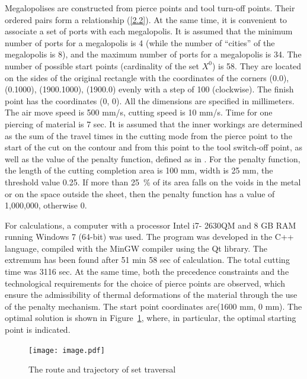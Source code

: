 Megalopolises are constructed from pierce points and tool turn-off points.
Their ordered pairs form a relationship (\ref{2.2}).
At the same time,
it is convenient to associate a set of ports with each megalopolis.
It is assumed that the minimum number of ports for a megalopolis is 4
(while the number of ``cities'' of the megalopolis is 8),
and the maximum number of ports for a megalopolis is 34.
The number of possible start points
(cardinality of the set $ X ^ 0 $)
is 58.
They are located on the sides of the original rectangle
with the coordinates of the corners
(0.0), (0.1000), (1900.1000), (1900.0)
evenly with a step of 100
(clockwise).
The finish point has the coordinates (0, 0).
All the dimensions are specified in millimeters.
The air move speed is 500 mm/s,
cutting speed is 10 mm/s.
Time for one piercing of material is 7 sec.
It is assumed that the inner workings are determined
as the sum of the travel times in the cutting mode
from the pierce point to the start of the cut on the contour
and from this point to
the tool switch-off point,
as well as the value of the penalty function,
defined as in
\cite{18}.
For the penalty function,
the length of the cutting completion area is 100 mm,
width is 25 mm,
the threshold value 0.25.
If more than 25~\% of its area
falls on the voids in the metal or on the space outside the sheet,
then the penalty function has a value of 1,000,000, otherwise 0.

For calculations, a computer with a processor Intel i7-
2630QM and 8 GB RAM running Windows 7 (64-bit) was used.
The program was developed in the C++ language,
compiled with the MinGW compiler using the Qt library.
The extremum  has been found after 51 min 58 sec of calculation.  The total cutting time was 3116 sec.
At the same time,
both the precedence constraints and the technological requirements for the choice of pierce points are observed,
which ensure the admissibility of thermal deformations of the material  through the use of the penalty mechanism.
The start point coordinates are(1600 mm, 0 mm).
The optimal solution is shown in Figure~\ref{fig:1},
where, in particular, the optimal starting point is indicated.

\begin{figure}
  \centering
  \texttt{[image: image.pdf]}
  \caption{The route and trajectory of set traversal}
  \label{fig:1}
\end{figure}

